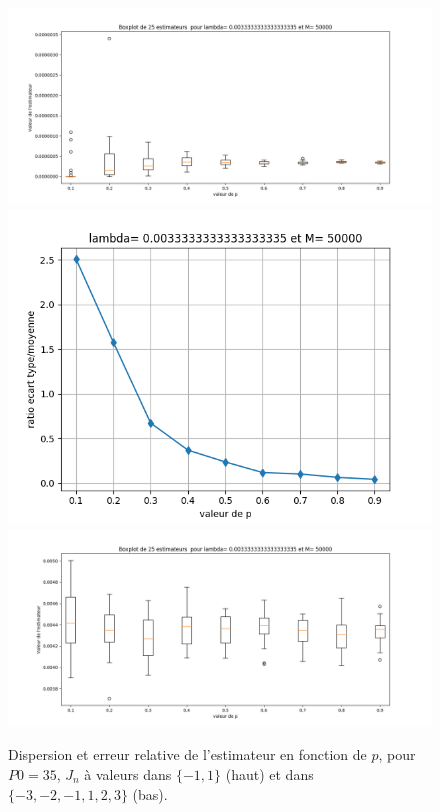 \documentclass[a4paper,11pt]{article}
\begin{document}
\begin{figure}
\begin{center}
\caption{Dispersion et erreur relative de l'estimateur en fonction de $p$, pour $P0=35$, $J_n$ à valeurs dans $\{-1,1\}$ (haut) et dans $\{-3,-2,-1,1,2,3\}$ (bas). }
\includegraphics[scale=0.25]{"Q1 MCMC IC i0 boxplot"}
\includegraphics[scale=0.4]{"Q1 MCMC IC i0 precision"}
\includegraphics[scale=0.25]{"Q1 MCMC IC i1 boxplot"}

\end{center}
\end{figure}
\end{document}
